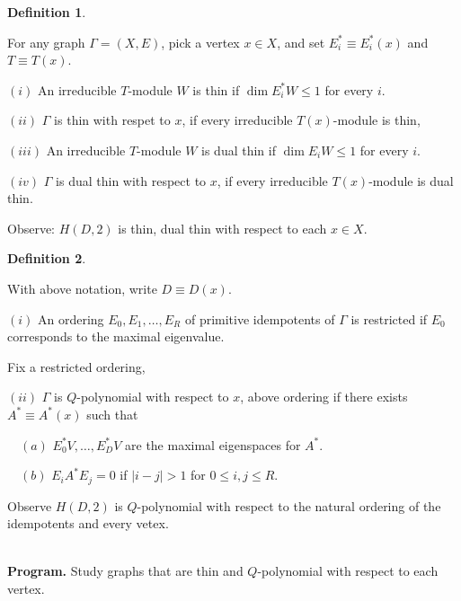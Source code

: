 \documentclass[
]{book}
\theoremstyle{definition}
\newtheorem{definition}{Definition}[chapter]
\theoremstyle{definition}
\theoremstyle{definition}
\theoremstyle{definition}
\theoremstyle{remark}
\begin{document}
\begin{definition}
\protect\hypertarget{def:thin-dualthin}{}\label{def:thin-dualthin}

For any graph \(\Gamma = (X, E)\), pick a vertex \(x\in X\), and set \(E^*_i \equiv E^*_i(x)\) and \(T \equiv T(x)\).

\((i)\) An irreducible \(T\)-module \(W\) is thin  if \(\dim E_i^*W \leq 1\) for every \(i\).

\((ii)\) \(\Gamma\) is thin with respet to \(x\), if every irreducible \(T(x)\)-module is thin,

\((iii)\) An irreducible \(T\)-module \(W\) is dual thin  if \(\dim E_iW \leq 1\) for every \(i\).

\((iv)\) \(\Gamma\) is dual thin with respect to \(x\), if every irreducible \(T(x)\)-module is dual thin.

\end{definition}

\hfill\break
Observe: \(H(D,2)\) is thin, dual thin with respect to each \(x\in X\).

\hfill\break

\begin{definition}
\protect\hypertarget{def:q-polynomial-graph}{}\label{def:q-polynomial-graph}

With above notation, write \(D \equiv D(x)\).

\((i)\) An ordering \(E_0, E_1, \ldots, E_R\) of primitive idempotents of \(\Gamma\) is restricted  if \(E_0\) corresponds to the maximal eigenvalue.

Fix a restricted ordering,

\((ii)\) \(\Gamma\) is \(Q\)-polynomial with respect to \(x\), above ordering if there exists \(A^* \equiv A^*(x)\) such that

\(\quad (a)\) \(E_0^*V, \ldots, E_D^*V\) are the maximal eigenspaces for \(A^*\).

\(\quad (b)\) \(E_iA^*E_j = 0\) if \(|i-j| > 1\) for \(0\leq i,j\leq R\).

\end{definition}

\hfill\break
Observe \(H(D,2)\) is \(Q\)-polynomial with respect to the natural ordering of the idempotents and every vetex.\\
\strut \\

\textbf{Program.} Study graphs that are thin and \(Q\)-polynomial with respect to each vertex.
\end{document}
